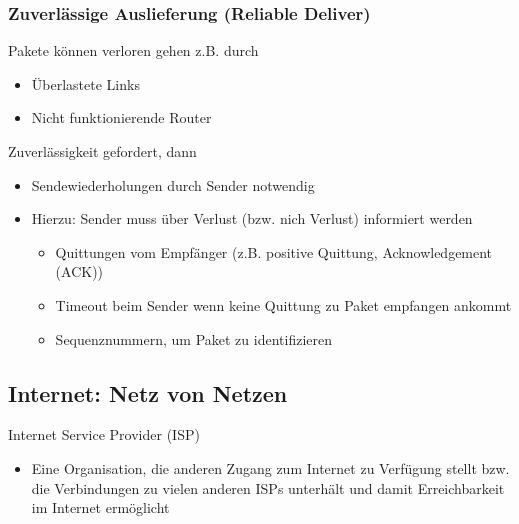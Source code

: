     \subsubsection{Zuverlässige Auslieferung (Reliable Deliver)}
      Pakete können verloren gehen z.B. durch
      \begin{itemize}
        \item Überlastete Links
        \item Nicht funktionierende Router
      \end{itemize}
      Zuverlässigkeit gefordert, dann
      \begin{itemize}
        \item Sendewiederholungen durch Sender notwendig
        \item Hierzu: Sender muss über Verlust (bzw. nich Verlust) informiert werden
          \begin{itemize}
            \item Quittungen vom Empfänger (z.B. positive Quittung, Acknowledgement (ACK))
            \item Timeout beim Sender wenn keine Quittung zu Paket empfangen ankommt
            \item Sequenznummern, um Paket zu identifizieren
          \end{itemize}
      \end{itemize}
  \subsection{Internet: Netz von Netzen}
    Internet Service Provider (ISP)
    \begin{itemize}
      \item Eine Organisation, die anderen Zugang zum Internet zu Verfügung stellt bzw. die Verbindungen
        zu vielen anderen ISPs unterhält und damit Erreichbarkeit im Internet ermöglicht
    \end{itemize}
